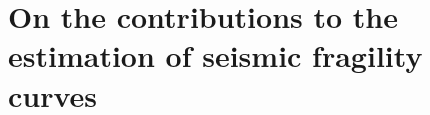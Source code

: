 














\section{On the contributions to the estimation of seismic fragility curves}\label{sec:concl:frags}





